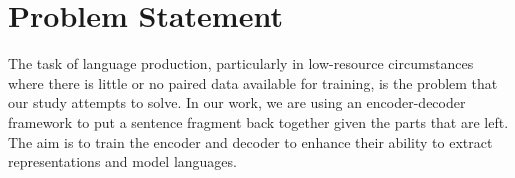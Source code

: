 \section{Problem Statement} \label{sec:problem statement}
The task of language production, particularly in low-resource circumstances where there is little or no paired data available for training, is the problem that our study attempts to solve. In our work, we are using an encoder-decoder framework to put a sentence fragment back together given the parts that are left. The aim is to train the encoder and decoder to enhance their ability to extract representations and model languages.